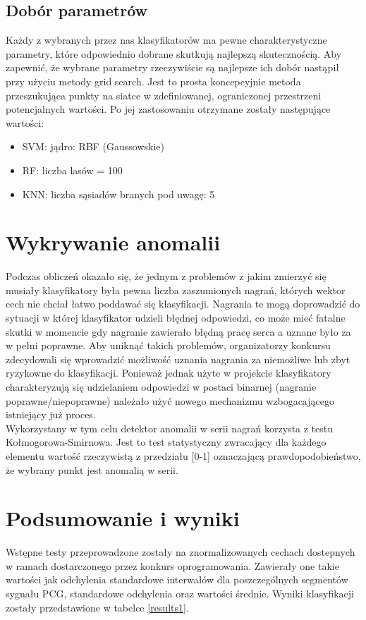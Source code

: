 \documentclass[a4paper]{report}
\begin{document}
\subsection{Dobór parametrów}
Każdy z wybranych przez nas klasyfikatorów ma pewne charakterystyczne parametry, które odpowiednio dobrane skutkują najlepszą skutecznością. Aby zapewnić, że wybrane parametry rzeczywiście są najlepsze ich dobór nastąpił przy użyciu metody grid search. Jest to prosta koncepcyjnie metoda przeszukująca punkty na siatce w zdefiniowanej, ograniczonej przestrzeni potencjalnych wartości. Po jej zastosowaniu otrzymane zostały następujące wartości:
\begin{itemize}
	\item SVM: jądro: RBF (Gaussowskie)
	\item RF: liczba lasów = 100 
	\item KNN: liczba sąsiadów branych pod uwagę: 5
\end{itemize}

\section{Wykrywanie anomalii}
Podczas obliczeń okazało się, że jednym z problemów z jakim zmierzyć się musiały klasyfikatory była pewna liczba zaszumionych nagrań, których wektor cech nie chciał łatwo poddawać się klasyfikacji. Nagrania te mogą doprowadzić do sytuacji w której klasyfikator udzieli błędnej odpowiedzi, co może mieć fatalne skutki w momencie gdy nagranie zawierało błędną pracę serca a uznane było za w pełni poprawne. Aby uniknąć takich problemów, organizatorzy konkursu zdecydowali się wprowadzić możliwość uznania nagrania za niemożliwe lub zbyt ryzykowne do klasyfikacji. Ponieważ jednak użyte w projekcie klasyfikatory charakteryzują się udzielaniem odpowiedzi w postaci binarnej (nagranie poprawne/niepoprawne) należało użyć nowego mechanizmu wzbogacającego istniejący już proces. \\

Wykorzystany w tym celu detektor anomalii w serii nagrań korzysta z testu Kołmogorowa-Smirnowa. Jest to test statystyczny zwracający dla każdego elementu wartość rzeczywistą z przedziału [0-1] oznaczającą prawdopodobieństwo, że wybrany punkt jest anomalią w serii. \\

\section{Podsumowanie i wyniki}
Wstępne testy przeprowadzone zostały na znormalizowanych cechach dostepnych w ramach dostarczonego przez konkurs oprogramowania. Zawierały one takie wartości jak odchylenia standardowe interwałów dla poszczególnych segmentów sygnału PCG, standardowe odchylenia oraz wartości średnie. Wyniki klasyfikacji zostały przedstawione w tabelce \ref{results1}. \\
\end{document}
